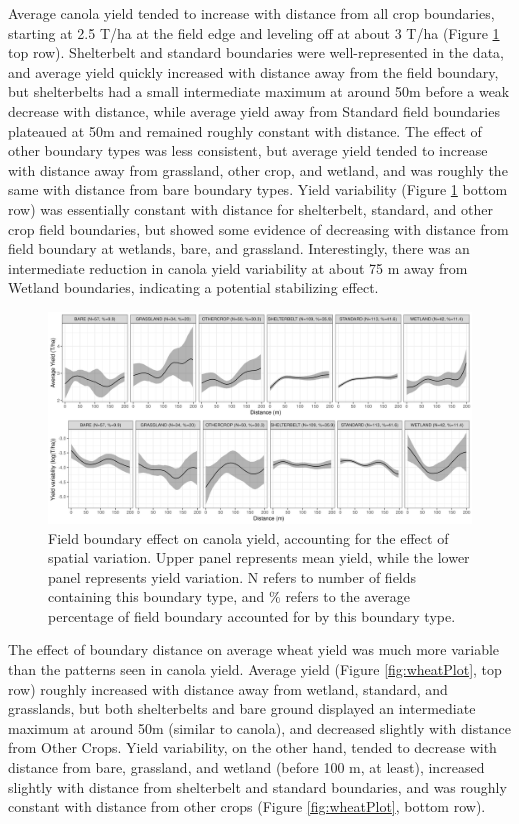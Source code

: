 \documentclass[]{elsarticle} %
\begin{document}
Average canola yield tended to increase with distance from all crop boundaries, starting at 2.5 T/ha at the field edge and leveling off at about 3 T/ha (Figure \ref{fig:canolaPlot} top row).
Shelterbelt and standard boundaries were well-represented in the data, and average yield quickly increased with distance away from the field boundary, but shelterbelts had a small intermediate maximum at around 50m before a weak decrease with distance, while average yield away from Standard field boundaries plateaued at 50m and remained roughly constant with distance.
The effect of other boundary types was less consistent, but average yield tended to increase with distance away from grassland, other crop, and wetland, and was roughly the same with distance from bare boundary types.
Yield variability (Figure \ref{fig:canolaPlot} bottom row) was essentially constant with distance for shelterbelt, standard, and other crop field boundaries, but showed some evidence of decreasing with distance from field boundary at wetlands, bare, and grassland.
Interestingly, there was an intermediate reduction in canola yield variability at about 75 m away from Wetland boundaries, indicating a potential stabilizing effect.

\begin{figure}
\includegraphics[width=1\linewidth]{../Figures/ModelSummary3a_canola} \caption{Field boundary effect on canola yield, accounting for the effect of spatial variation. Upper panel represents mean yield, while the lower panel represents yield variation. N refers to number of fields containing this boundary type, and \% refers to the average percentage of field boundary accounted for by this boundary type.}\label{fig:canolaPlot}
\end{figure}

The effect of boundary distance on average wheat yield was much more variable than the patterns seen in canola yield.
Average yield (Figure \ref{fig:wheatPlot}, top row) roughly increased with distance away from wetland, standard, and grasslands, but both shelterbelts and bare ground displayed an intermediate maximum at around 50m (similar to canola), and decreased slightly with distance from Other Crops.
Yield variability, on the other hand, tended to decrease with distance from bare, grassland, and wetland (before 100 m, at least), increased slightly with distance from shelterbelt and standard boundaries, and was roughly constant with distance from other crops (Figure \ref{fig:wheatPlot}, bottom row).
\end{document}
